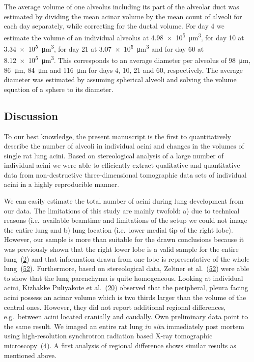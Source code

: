 \documentclass[
  american,
]{article}
\begin{document}
The average volume of one alveolus including its part of the alveolar duct was estimated by dividing the mean acinar volume by the mean count of alveoli for each day separately, while correcting for the ductal volume.
For day 4 we estimate the volume of an individual alveolus at 4.98~×~10\textsuperscript{5}~μm\textsuperscript{3}, for day 10 at 3.34~×~10\textsuperscript{5}~μm\textsuperscript{3}, for day 21 at 3.07~×~10\textsuperscript{5}~μm\textsuperscript{3} and for day 60 at 8.12~×~10\textsuperscript{5}~μm\textsuperscript{3}.
This corresponds to an average diameter per alveolus of 98~μm, 86~μm, 84~μm and 116~μm for days 4, 10, 21 and 60, respectively.
The average diameter was estimated by assuming spherical alveoli and solving the volume equation of a sphere to its diameter.

\hypertarget{discussion}{%
\subsection{Discussion}\label{discussion}}

To our best knowledge, the present manuscript is the first to quantitatively describe the number of alveoli in individual acini and changes in the volumes of single rat lung acini.
Based on stereological analysis of a large number of individual acini we were able to efficiently extract qualitative and quantitative data from non-destructive three-dimensional tomographic data sets of individual acini in a highly reproducible manner.

We can easily estimate the total number of acini during lung development from our data.
The limitations of this study are mainly twofold: a) due to technical reasons (i.e.~available beamtime and limitations of the setup we could not image the entire lung and b) lung location (i.e.~lower medial tip of the right lobe).
However, our sample is more than suitable for the drawn conclusions because it was previously shown that the right lower lobe is a valid sample for the entire lung~(\protect\hyperlink{ref-14OP85b2F}{2}) and that information drawn from one lobe is representative of the whole lung~(\protect\hyperlink{ref-I9TmP6IU}{52}).
Furthermore, based on stereological data, Zeltner et al.~(\protect\hyperlink{ref-I9TmP6IU}{52}) were able to show that the lung parenchyma is quite homogeneous.
Looking at individual acini, Kizhakke Puliyakote et al.~(\protect\hyperlink{ref-RGBeCf8v}{20}) observed that the peripheral, pleura facing acini possess an acinar volume which is two thirds larger than the volume of the central ones.
However, they did not report additional regional differences, e.g.~between acini located cranially and caudally.
Own preliminary data point to the same result.
We imaged an entire rat lung \emph{in situ} immediately post mortem using high-resolution synchrotron radiation based X-ray tomographic microscopy~(\protect\hyperlink{ref-Zv1XcgAO}{4}).
A first analysis of regional difference shows similar results as mentioned above.
\end{document}
